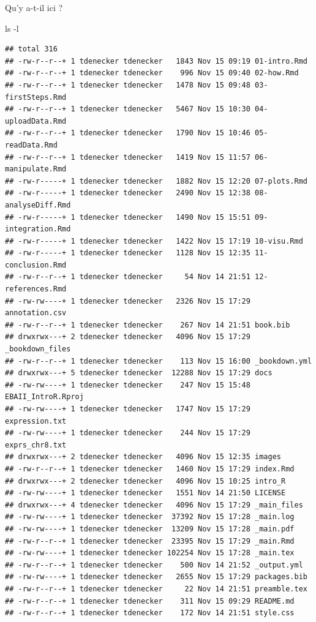 \documentclass[
]{book}
\newenvironment{Shaded}{\begin{snugshade}}{\end{snugshade}}
\newcommand{\AttributeTok}[1]{\textcolor[rgb]{0.77,0.63,0.00}{#1}}
\newcommand{\FunctionTok}[1]{\textcolor[rgb]{0.00,0.00,0.00}{#1}}
\begin{document}
Qu'y a-t-il ici ?

\begin{Shaded}
\begin{Highlighting}[]
\FunctionTok{ls} \AttributeTok{{-}l}
\end{Highlighting}
\end{Shaded}

\begin{verbatim}
## total 316
## -rw-r--r--+ 1 tdenecker tdenecker   1843 Nov 15 09:19 01-intro.Rmd
## -rw-r--r--+ 1 tdenecker tdenecker    996 Nov 15 09:40 02-how.Rmd
## -rw-r--r--+ 1 tdenecker tdenecker   1478 Nov 15 09:48 03-firstSteps.Rmd
## -rw-r--r--+ 1 tdenecker tdenecker   5467 Nov 15 10:30 04-uploadData.Rmd
## -rw-r--r--+ 1 tdenecker tdenecker   1790 Nov 15 10:46 05-readData.Rmd
## -rw-r--r--+ 1 tdenecker tdenecker   1419 Nov 15 11:57 06-manipulate.Rmd
## -rw-r-----+ 1 tdenecker tdenecker   1882 Nov 15 12:20 07-plots.Rmd
## -rw-r-----+ 1 tdenecker tdenecker   2490 Nov 15 12:38 08-analyseDiff.Rmd
## -rw-r-----+ 1 tdenecker tdenecker   1490 Nov 15 15:51 09-integration.Rmd
## -rw-r-----+ 1 tdenecker tdenecker   1422 Nov 15 17:19 10-visu.Rmd
## -rw-r-----+ 1 tdenecker tdenecker   1128 Nov 15 12:35 11-conclusion.Rmd
## -rw-r--r--+ 1 tdenecker tdenecker     54 Nov 14 21:51 12-references.Rmd
## -rw-rw----+ 1 tdenecker tdenecker   2326 Nov 15 17:29 annotation.csv
## -rw-r--r--+ 1 tdenecker tdenecker    267 Nov 14 21:51 book.bib
## drwxrwx---+ 2 tdenecker tdenecker   4096 Nov 15 17:29 _bookdown_files
## -rw-r--r--+ 1 tdenecker tdenecker    113 Nov 15 16:00 _bookdown.yml
## drwxrwx---+ 5 tdenecker tdenecker  12288 Nov 15 17:29 docs
## -rw-rw----+ 1 tdenecker tdenecker    247 Nov 15 15:48 EBAII_IntroR.Rproj
## -rw-rw----+ 1 tdenecker tdenecker   1747 Nov 15 17:29 expression.txt
## -rw-rw----+ 1 tdenecker tdenecker    244 Nov 15 17:29 exprs_chr8.txt
## drwxrwx---+ 2 tdenecker tdenecker   4096 Nov 15 12:35 images
## -rw-r--r--+ 1 tdenecker tdenecker   1460 Nov 15 17:29 index.Rmd
## drwxrwx---+ 2 tdenecker tdenecker   4096 Nov 15 10:25 intro_R
## -rw-rw----+ 1 tdenecker tdenecker   1551 Nov 14 21:50 LICENSE
## drwxrwx---+ 4 tdenecker tdenecker   4096 Nov 15 17:29 _main_files
## -rw-rw----+ 1 tdenecker tdenecker  37392 Nov 15 17:28 _main.log
## -rw-rw----+ 1 tdenecker tdenecker  13209 Nov 15 17:28 _main.pdf
## -rw-r--r--+ 1 tdenecker tdenecker  23395 Nov 15 17:29 _main.Rmd
## -rw-rw----+ 1 tdenecker tdenecker 102254 Nov 15 17:28 _main.tex
## -rw-r--r--+ 1 tdenecker tdenecker    500 Nov 14 21:52 _output.yml
## -rw-rw----+ 1 tdenecker tdenecker   2655 Nov 15 17:29 packages.bib
## -rw-r--r--+ 1 tdenecker tdenecker     22 Nov 14 21:51 preamble.tex
## -rw-r--r--+ 1 tdenecker tdenecker    311 Nov 15 09:29 README.md
## -rw-r--r--+ 1 tdenecker tdenecker    172 Nov 14 21:51 style.css
\end{verbatim}
\end{document}
